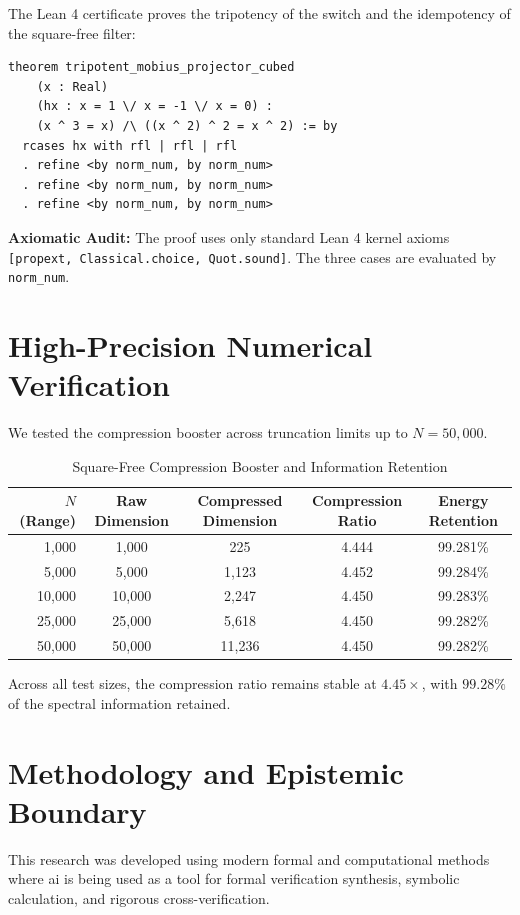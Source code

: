 \documentclass[11pt,a4paper]{article}
\theoremstyle{definition}
\begin{document}
The Lean 4 certificate proves the tripotency of the switch and the idempotency of the square-free filter:

\begin{lstlisting}[language=Lean4]
theorem tripotent_mobius_projector_cubed
    (x : Real)
    (hx : x = 1 \/ x = -1 \/ x = 0) :
    (x ^ 3 = x) /\ ((x ^ 2) ^ 2 = x ^ 2) := by
  rcases hx with rfl | rfl | rfl
  . refine <by norm_num, by norm_num>
  . refine <by norm_num, by norm_num>
  . refine <by norm_num, by norm_num>
\end{lstlisting}

\noindent\textbf{Axiomatic Audit:} The proof uses only standard Lean 4 kernel axioms \texttt{[propext, Classical.choice, Quot.sound]}. The three cases are evaluated by \texttt{norm\_num}.


\section{High-Precision Numerical Verification}

We tested the compression booster across truncation limits up to $N = 50,000$.

\begin{table}[htbp]
\centering
\caption{Square-Free Compression Booster and Information Retention}
\begin{tabular}{rcccc}
\toprule
$N$ (Range) & Raw Dimension & Compressed Dimension & Compression Ratio & Energy Retention \\
\midrule
1,000 & 1,000 & 225 & 4.444 & 99.281\% \\
5,000 & 5,000 & 1,123 & 4.452 & 99.284\% \\
10,000 & 10,000 & 2,247 & 4.450 & 99.283\% \\
25,000 & 25,000 & 5,618 & 4.450 & 99.282\% \\
50,000 & 50,000 & 11,236 & 4.450 & 99.282\% \\
\bottomrule
\end{tabular}
\end{table}

\noindent Across all test sizes, the compression ratio remains stable at $4.45\times$, with $99.28\%$ of the spectral information retained.


\section{Methodology and Epistemic Boundary}
\noindent This research was developed using modern formal and computational methods where ai is being used as a tool for formal verification synthesis, symbolic calculation, and rigorous cross-verification.
\end{document}
